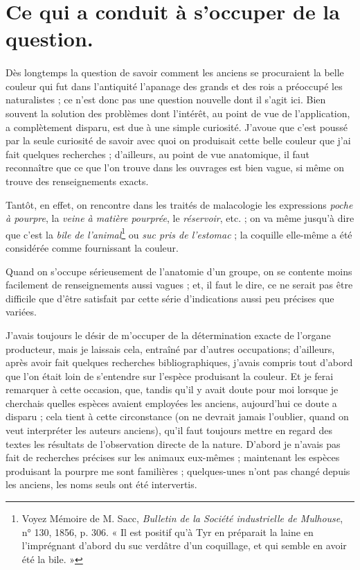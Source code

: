 \documentclass[a4paper, 11pt, oneside, polutonikogreek, french]{article}
\begin{document}
\section{Ce qui a conduit à s'occuper de la question.}
\paragraph{}
Dès longtemps la question de savoir comment les anciens se procuraient la belle couleur qui fut dans l'antiquité l'apanage des grands et des rois a préoccupé les naturalistes ; ce n'est donc pas une question nouvelle dont il s'agit ici. Bien souvent la solution des problèmes dont l'intérêt, au point de vue de l'application, a complètement disparu, est due à une simple curiosité. J'avoue que c'est poussé par la seule curiosité de savoir avec quoi on produisait cette belle couleur que j'ai fait quelques recherches ; d'ailleurs, au point de vue anatomique, il faut reconnaître que ce que l'on trouve dans les ouvrages est bien vague, si même on trouve des renseignements exacts.

Tantôt, en effet, on rencontre dans les traités de malacologie les expressions \emph{poche à pourpre}, la \emph{veine à matière pourprée}, le \emph{réservoir}, etc. ; on va même jusqu'à dire que c'est la \emph{bile de l'animal}\footnote{Voyez Mémoire de M. Sacc, \emph{Bulletin de la Société industrielle de Mulhouse}, n° 130, 1856, p. 306. « Il est positif qu'à Tyr en préparait la laine en l'imprégnant d'abord du suc verdâtre d'un coquillage, et qui semble en avoir été la bile. »} ou \emph{suc pris de l'estomac} ; la coquille elle-même a été considérée comme fournissant la couleur.

Quand on s'occupe sérieusement de l'anatomie d'un groupe, on se contente moins facilement de renseignements aussi vagues ; et, il faut le dire, ce ne serait pas être difficile que d'être satisfait par cette série d'indications aussi peu précises que variées.

J'avais toujours le désir de m'occuper de la détermination exacte de l'organe producteur, mais je laissais cela, entraîné par d'autres occupations; d'ailleurs, après avoir fait quelques recherches bibliographiques, j'avais compris tout d'abord que l'on était loin de s'entendre sur l'espèce produisant la couleur. Et je ferai remarquer à cette occasion, que, tandis qu'il y avait doute pour moi lorsque je cherchais quelles espèces avaient employées les anciens, aujourd'hui ce doute a disparu ; cela tient à cette circonstance (on ne devrait jamais l'oublier, quand on veut interpréter les auteurs anciens), qu'il faut toujours mettre en regard des textes les résultats de l'observation directe de la nature. D'abord je n'avais pas fait de recherches précises sur les animaux eux-mêmes ; maintenant les espèces produisant la pourpre me sont familières ; quelques-unes n'ont pas changé depuis les anciens, les noms seuls ont été intervertis.
\end{document}
